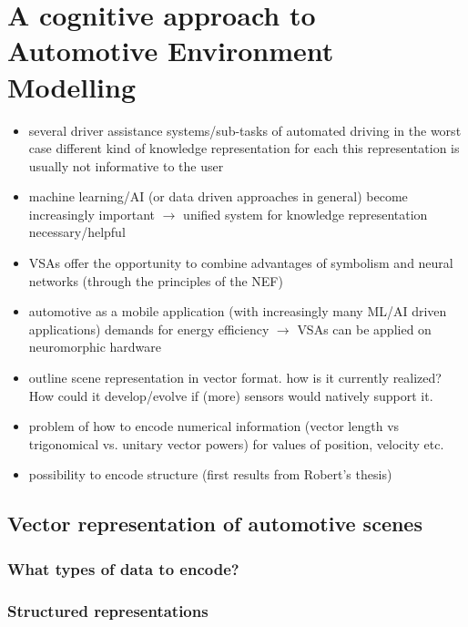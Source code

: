 \chapter{A cognitive approach to Automotive Environment Modelling}

\begin{itemize}
	\item several driver assistance systems/sub-tasks of automated driving
	\subitem in the worst case different kind of knowledge representation for each
	\subitem this representation is usually not informative to the user

	\item machine learning/\ac{AI} (or data driven approaches in general) become increasingly important $\rightarrow$ unified system for knowledge representation necessary/helpful
	\item \aclp{VSA} offer the opportunity to combine advantages of symbolism and neural networks (through the principles of the \acf{NEF})
	\item automotive as a mobile application (with increasingly many ML/AI driven applications) demands for energy efficiency $\rightarrow$ \acp{VSA} can be applied on neuromorphic hardware
	\item outline scene representation in vector format. how is it currently realized? How could it develop/evolve if (more) sensors would natively support it.
	\item problem of how to encode numerical information (vector length vs trigonomical vs. unitary vector powers) for values of position, velocity etc.
	\item possibility to encode structure (first results from Robert's thesis)
\end{itemize}

\section{Vector representation of automotive scenes}
\subsection{What types of data to encode?}
\subsection{Structured representations}
